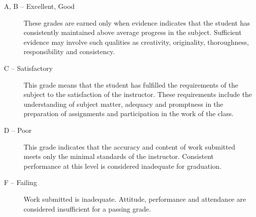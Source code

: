 \begin{description}
  \item[A, B -- Excellent, Good]
    These grades are earned only when evidence indicates that the student
    has consistently maintained above average progress in the subject.
    Sufficient evidence may involve such qualities as creativity, originality,
    thoroughness, responsibility and consistency.
  \item[C -- Satisfactory]
    This grade means that the student has fulfilled the requirements of the
    subject to the satisfaction of the instructor. These requirements include
    the understanding of subject matter, adequacy and promptness in the
    preparation of assignments and participation in the work of the class.
  \item[D -- Poor]
    This grade indicates that the accuracy and content of work submitted meets
    only the minimal standards of the instructor. Consistent performance at
    this level is considered inadequate for graduation.
  \item[F -- Failing]
    Work submitted is inadequate. Attitude, performance and attendance are
    considered insufficient for a passing grade.
\end{description}
